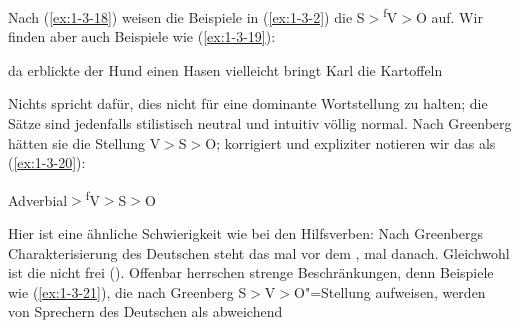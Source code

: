 \documentclass[output=paper]{langsci/langscibook}
\begin{document}
\label{subsec:1-3.2}

\ssubsubsection{}%
\label{subsubsec:1-3.2.1}

Nach (\ref{ex:1-3-18}) weisen die Beispiele in (\ref{ex:1-3-2}) die  S$>$\textsuperscript{f}V$>$O auf. Wir finden
aber auch Beispiele wie (\ref{ex:1-3-19}):
\begin{exe}
\ex\label{ex:1-3-19}
\begin{xlist}
\ex\label{ex:1-3-19a} da erblickte der Hund einen Hasen
\ex\label{ex:1-3-19b} vielleicht bringt Karl die Kartoffeln
\end{xlist}
\end{exe}
Nichts spricht dafür, dies nicht für eine dominante Wortstellung zu halten; die Sätze
sind jedenfalls stilistisch neutral und intuitiv völlig normal. Nach Greenberg hätten
sie die Stellung V$>$S$>$O; korrigiert und expliziter notieren wir das als (\ref{ex:1-3-20}):
\begin{exe}
\ex\label{ex:1-3-20}
Adverbial$>$\textsuperscript{f}V$>$S$>$O
\end{exe}
Hier ist eine ähnliche Schwierigkeit wie bei den Hilfsverben: Nach
Greenbergs Charakterisierung des Deutschen steht das  mal vor
dem , mal danach. Gleichwohl ist die  nicht frei
(). Offenbar herrschen strenge Beschränkungen, denn
Beispiele wie (\ref{ex:1-3-21}), die nach Greenberg S$>$V$>$O"=Stellung
aufweisen, werden von Sprechern des Deutschen als abweichend
\end{document}
